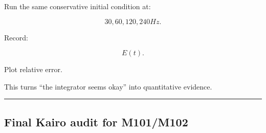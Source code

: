 \hypertarget{06-engine-ii-ch039-experiment-7-energy-drift-sweep}{}

Run the same conservative initial condition at:

\[
30,60,120,240Hz.
\]

Record:

\[
E(t).
\]

Plot relative error.

This turns ``the integrator seems okay'' into quantitative evidence.

\begin{center}\rule{0.5\linewidth}{0.5pt}\end{center}

\subsection{Final Kairo audit for M101/M102}\label{06-engine-ii-ch039-final-kairo-audit-for-m101m102}

\hypertarget{06-engine-ii-ch039-final-kairo-audit-for-m101m102}{}

